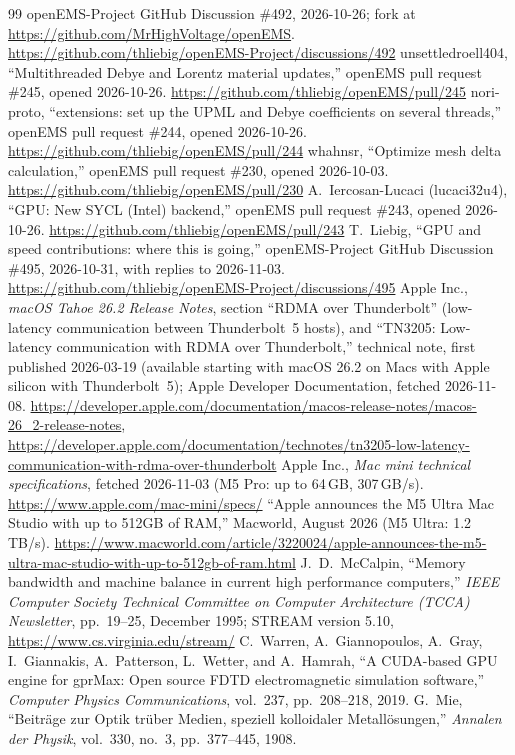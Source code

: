 \documentclass[10pt,a4paper]{article}
\begin{document}
\begin{thebibliography}{99}
  openEMS-Project GitHub Discussion \#492, 2026-10-26; fork at \url{https://github.com/MrHighVoltage/openEMS}.
  \url{https://github.com/thliebig/openEMS-Project/discussions/492}
 unsettledroell404, ``Multithreaded Debye and Lorentz material updates,'' openEMS pull request \#245,
  opened 2026-10-26. \url{https://github.com/thliebig/openEMS/pull/245}
 nori-proto, ``extensions: set up the UPML and Debye coefficients on several threads,'' openEMS pull
  request \#244, opened 2026-10-26. \url{https://github.com/thliebig/openEMS/pull/244}
 whahnsr, ``Optimize mesh delta calculation,'' openEMS pull request \#230, opened 2026-10-03.
  \url{https://github.com/thliebig/openEMS/pull/230}
 A.~Iercosan-Lucaci (lucaci32u4), ``GPU: New SYCL (Intel) backend,'' openEMS pull request \#243,
  opened 2026-10-26. \url{https://github.com/thliebig/openEMS/pull/243}
 T.~Liebig, ``GPU and speed contributions: where this is going,'' openEMS-Project GitHub
  Discussion \#495, 2026-10-31, with replies to 2026-11-03.
  \url{https://github.com/thliebig/openEMS-Project/discussions/495}
 Apple Inc., \emph{macOS Tahoe 26.2 Release Notes}, section ``RDMA over Thunderbolt'' (low-latency
  communication between Thunderbolt~5 hosts), and ``TN3205: Low-latency communication with RDMA over Thunderbolt,''
  technical note, first published 2026-03-19 (available starting with macOS 26.2 on Macs with Apple silicon with
  Thunderbolt~5); Apple Developer Documentation, fetched 2026-11-08.
  \url{https://developer.apple.com/documentation/macos-release-notes/macos-26_2-release-notes},
  \url{https://developer.apple.com/documentation/technotes/tn3205-low-latency-communication-with-rdma-over-thunderbolt}
 Apple Inc., \emph{Mac mini technical specifications}, fetched 2026-11-03 (M5 Pro: up to 64\,GB,
  307\,GB/s). \url{https://www.apple.com/mac-mini/specs/}
 ``Apple announces the M5 Ultra Mac Studio with up to 512GB of RAM,'' Macworld, August 2026 (M5 Ultra:
  1.2\,TB/s). \url{https://www.macworld.com/article/3220024/apple-announces-the-m5-ultra-mac-studio-with-up-to-512gb-of-ram.html}
 J.~D.~McCalpin, ``Memory bandwidth and machine balance in current high performance computers,''
  \emph{IEEE Computer Society Technical Committee on Computer Architecture (TCCA) Newsletter}, pp.~19--25, December 1995;
  STREAM version 5.10, \url{https://www.cs.virginia.edu/stream/}
 C.~Warren, A.~Giannopoulos, A.~Gray, I.~Giannakis, A.~Patterson, L.~Wetter, and A.~Hamrah,
  ``A CUDA-based GPU engine for gprMax: Open source FDTD electromagnetic simulation software,'' \emph{Computer Physics
  Communications}, vol.~237, pp.~208--218, 2019.
 G.~Mie, ``Beitr\"age zur Optik tr\"uber Medien, speziell kolloidaler Metall\"osungen,'' \emph{Annalen der
  Physik}, vol.~330, no.~3, pp.~377--445, 1908.
\end{thebibliography}
\end{document}
